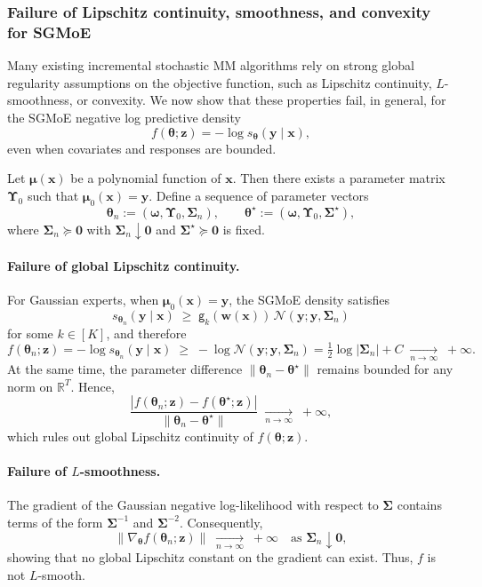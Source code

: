 \documentclass{article}
\newcommand{\zero}{\ensuremath{\mathbf{0}}}
\newcommand{\cN}{\mathcal{N}}
\def\rset{\mathbb{R}}
\def\sfg{\mathsf{g}}
\def\vmu{{\bm{\mu}}}
\def\vomega{{\bm{\omega}}}
\def\vtheta{{\bm{\theta}}}
\def\vw{{\bm{w}}}
\def\vx{{\bm{x}}}
\def\vy{{\bm{y}}}
\def\vz{{\bm{z}}}
\def\mSigma{{\bm{\Sigma}}}
\def\mUpsilon{{\bm{\Upsilon}}}
\begin{document}
\subsubsection{Failure of Lipschitz continuity, smoothness, and convexity for SGMoE}
\label{sec: prop_check for SGMoE}

Many existing incremental stochastic MM algorithms rely on strong global regularity assumptions on the objective function, such as Lipschitz continuity, $L$-smoothness, or convexity.  
We now show that these properties fail, in general, for the SGMoE negative log predictive density
\[
f(\vtheta;\vz) = -\log s_{\vtheta}(\vy\mid\vx),
\]
even when covariates and responses are bounded.

Let $\vmu(\vx)$ be a polynomial function of $\vx$. Then there exists a parameter matrix
$\mUpsilon_0$ such that $\vmu_0(\vx)=\vy$.
Define a sequence of parameter vectors
\[
\vtheta_n := (\vomega,\mUpsilon_0,\mSigma_n),
\qquad
\vtheta^\star := (\vomega,\mUpsilon_0,\mSigma^\star),
\]
where $\mSigma_n \succeq \zero$ with $\mSigma_n \downarrow \zero$ and $\mSigma^\star \succeq \zero$ is fixed.

\paragraph{Failure of global Lipschitz continuity.}
For Gaussian experts, when $\vmu_0(\vx)=\vy$, the SGMoE density satisfies
\[
s_{\vtheta_n}(\vy\mid\vx)
\;\ge\;
\sfg_k(\vw(\vx))\,\cN(\vy;\vy,\mSigma_n)
\]
for some $k\in[K]$, and therefore
\[
f(\vtheta_n;\vz)
= -\log s_{\vtheta_n}(\vy\mid\vx)
\;\ge\;
-\log \cN(\vy;\vy,\mSigma_n)
= \tfrac12 \log |\mSigma_n| + C
\;\xrightarrow[n\to\infty]{}\; +\infty.
\]
At the same time, the parameter difference
$\|\vtheta_n-\vtheta^\star\|$ remains bounded for any norm on $\rset^T$.
Hence,
\[
\frac{|f(\vtheta_n;\vz)-f(\vtheta^\star;\vz)|}
{\|\vtheta_n-\vtheta^\star\|}
\;\xrightarrow[n\to\infty]{}\; +\infty,
\]
which rules out global Lipschitz continuity of $f(\vtheta;\vz)$.

\paragraph{Failure of $L$-smoothness.}
The gradient of the Gaussian negative log-likelihood with respect to $\mSigma$ contains terms of the form
$\mSigma^{-1}$ and $\mSigma^{-2}$. Consequently,
\[
\|\nabla_\vtheta f(\vtheta_n;\vz)\|
\;\xrightarrow[n\to\infty]{}\; +\infty
\quad \text{as } \mSigma_n \downarrow \zero,
\]
showing that no global Lipschitz constant on the gradient can exist. Thus, $f$ is not $L$-smooth.
\end{document}
